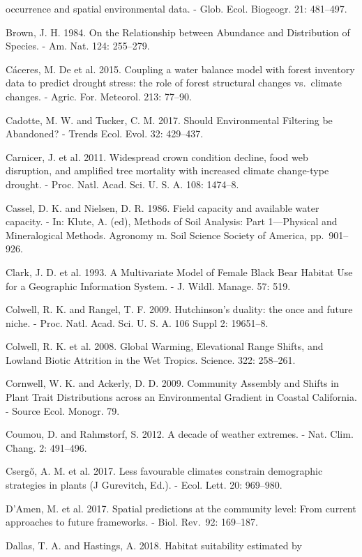 \documentclass[11pt,twoside]{reedthesis}
\begin{document}
occurrence and spatial environmental data. - Glob. Ecol. Biogeogr. 21:
481--497.\par
Brown, J. H. 1984. On the Relationship between Abundance and
Distribution of Species. - Am. Nat. 124: 255--279.\par
Cáceres, M. De et al. 2015. Coupling a water balance model with forest
inventory data to predict drought stress: the role of forest structural
changes vs.~climate changes. - Agric. For. Meteorol. 213: 77--90.\par
Cadotte, M. W. and Tucker, C. M. 2017. Should Environmental Filtering be
Abandoned? - Trends Ecol. Evol. 32: 429--437.\par
Carnicer, J. et al. 2011. Widespread crown condition decline, food web
disruption, and amplified tree mortality with increased climate
change-type drought. - Proc. Natl. Acad. Sci. U. S. A. 108: 1474--8.\par
Cassel, D. K. and Nielsen, D. R. 1986. Field capacity and available
water capacity. - In: Klute, A. (ed), Methods of Soil Analysis: Part
1---Physical and Mineralogical Methods. Agronomy m. Soil Science Society
of America, pp.~901--926.\par
Clark, J. D. et al. 1993. A Multivariate Model of Female Black Bear
Habitat Use for a Geographic Information System. - J. Wildl. Manage. 57:
519.\par
Colwell, R. K. and Rangel, T. F. 2009. Hutchinson's duality: the once
and future niche. - Proc. Natl. Acad. Sci. U. S. A. 106 Suppl 2:
19651--8.\par
Colwell, R. K. et al. 2008. Global Warming, Elevational Range Shifts,
and Lowland Biotic Attrition in the Wet Tropics. Science. 322:
258--261.\par
Cornwell, W. K. and Ackerly, D. D. 2009. Community Assembly and Shifts
in Plant Trait Distributions across an Environmental Gradient in Coastal
California. - Source Ecol. Monogr. 79.\par
Coumou, D. and Rahmstorf, S. 2012. A decade of weather extremes. - Nat.
Clim. Chang. 2: 491--496.\par
Csergő, A. M. et al. 2017. Less favourable climates constrain
demographic strategies in plants (J Gurevitch, Ed.). - Ecol. Lett. 20:
969--980.\par
D'Amen, M. et al. 2017. Spatial predictions at the community level: From
current approaches to future frameworks. - Biol. Rev.~92: 169--187.\par
Dallas, T. A. and Hastings, A. 2018. Habitat suitability estimated by
\end{document}
